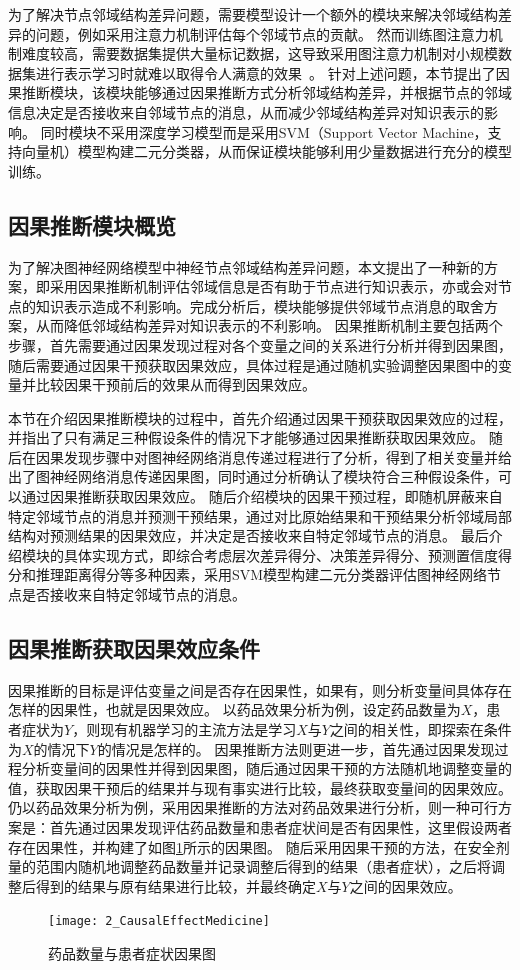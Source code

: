 \documentclass[algorithmlist, AutoFakeBold, AutoFakeSlant, figurelist, tablelist, nomlist, engineering]{seuthesix}
\begin{document}
为了解决节点邻域结构差异问题，需要模型设计一个额外的模块来解决邻域结构差异的问题，例如采用注意力机制评估每个邻域节点的贡献。
然而训练图注意力机制难度较高，需要数据集提供大量标记数据，这导致采用图注意力机制对小规模数据集进行表示学习时就难以取得令人满意的效果~\cite{knyazev2019understanding}。
针对上述问题，本节提出了因果推断模块，该模块能够通过因果推断方式分析邻域结构差异，并根据节点的邻域信息决定是否接收来自邻域节点的消息，从而减少邻域结构差异对知识表示的影响。
同时模块不采用深度学习模型而是采用SVM（Support Vector Machine，支持向量机）模型构建二元分类器，从而保证模块能够利用少量数据进行充分的模型训练。

\subsection{因果推断模块概览}
为了解决图神经网络模型中神经节点邻域结构差异问题，本文提出了一种新的方案，即采用因果推断机制评估邻域信息是否有助于节点进行知识表示，亦或会对节点的知识表示造成不利影响。完成分析后，模块能够提供邻域节点消息的取舍方案，从而降低邻域结构差异对知识表示的不利影响。
因果推断机制主要包括两个步骤，首先需要通过因果发现过程对各个变量之间的关系进行分析并得到因果图，随后需要通过因果干预获取因果效应，具体过程是通过随机实验调整因果图中的变量并比较因果干预前后的效果从而得到因果效应。

本节在介绍因果推断模块的过程中，首先介绍通过因果干预获取因果效应的过程，并指出了只有满足三种假设条件的情况下才能够通过因果推断获取因果效应。
随后在因果发现步骤中对图神经网络消息传递过程进行了分析，得到了相关变量并给出了图神经网络消息传递因果图，同时通过分析确认了模块符合三种假设条件，可以通过因果推断获取因果效应。
随后介绍模块的因果干预过程，即随机屏蔽来自特定邻域节点的消息并预测干预结果，通过对比原始结果和干预结果分析邻域局部结构对预测结果的因果效应，并决定是否接收来自特定邻域节点的消息。
最后介绍模块的具体实现方式，即综合考虑层次差异得分、决策差异得分、预测置信度得分和推理距离得分等多种因素，采用SVM模型构建二元分类器评估图神经网络节点是否接收来自特定邻域节点的消息。

\subsection{因果推断获取因果效应条件}
因果推断的目标是评估变量之间是否存在因果性，如果有，则分析变量间具体存在怎样的因果性，也就是因果效应。
以药品效果分析为例，设定药品数量为$X$，患者症状为$Y$，则现有机器学习的主流方法是学习$X$与$Y$之间的相关性，即探索在条件为$X$的情况下$Y$的情况是怎样的。
因果推断方法则更进一步，首先通过因果发现过程分析变量间的因果性并得到因果图，随后通过因果干预的方法随机地调整变量的值，获取因果干预后的结果并与现有事实进行比较，最终获取变量间的因果效应。
仍以药品效果分析为例，采用因果推断的方法对药品效果进行分析，则一种可行方案是：首先通过因果发现评估药品数量和患者症状间是否有因果性，这里假设两者存在因果性，并构建了如图\ref{2_CausalEffectMedicine}所示的因果图。
随后采用因果干预的方法，在安全剂量的范围内随机地调整药品数量并记录调整后得到的结果（患者症状），之后将调整后得到的结果与原有结果进行比较，并最终确定$X$与$Y$之间的因果效应。
\begin{figure}
  \centering
  \texttt{[image: 2\_CausalEffectMedicine]}
  \caption{药品数量与患者症状因果图}
  \label{2_CausalEffectMedicine}
\end{figure}
\end{document}
